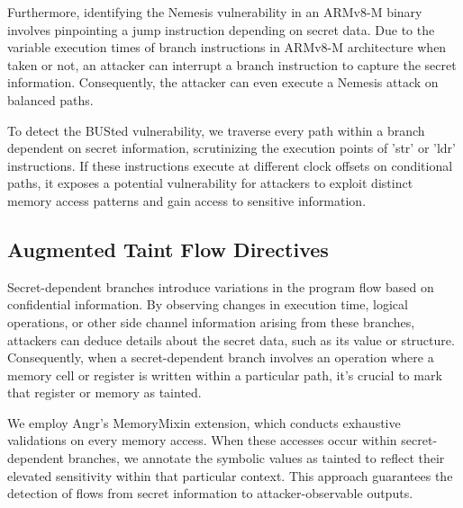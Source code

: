 Furthermore, identifying the Nemesis vulnerability in an ARMv8-M binary
involves pinpointing a jump instruction depending on secret data. Due to
the variable execution times of branch instructions in ARMv8-M architecture
when taken or not, an attacker can interrupt a branch instruction to
capture the secret information. Consequently, the attacker can even execute
a Nemesis attack on balanced paths.

To detect the BUSted vulnerability, we traverse
every path within a branch dependent on secret information, scrutinizing
the execution points of 'str' or 'ldr' instructions. If these instructions
execute at different clock offsets on conditional paths, it exposes a
potential vulnerability for attackers to exploit distinct memory access
patterns and gain access to sensitive information.

\subsection{Augmented Taint Flow Directives}

Secret-dependent branches introduce variations in the program flow based on
confidential information. By observing changes in execution time, logical
operations, or other side channel information arising from these branches,
attackers can deduce details about the secret data, such as its value or
structure. Consequently, when a secret-dependent branch involves an
operation where a memory cell or register is written within a particular
path, it's crucial to mark that register or memory as tainted.

We employ Angr’s MemoryMixin extension, which conducts exhaustive
validations on every memory access. When these accesses occur
within secret-dependent branches, we annotate the symbolic
values as tainted to reflect their elevated sensitivity within that
particular context. This approach guarantees the detection of flows from
secret information to attacker-observable outputs.

